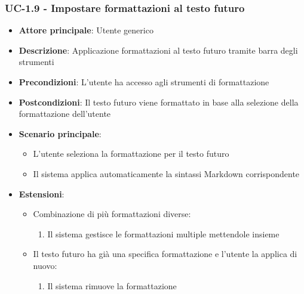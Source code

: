 \documentclass[11pt,a4paper]{article}
\begin{document}
\subsubsection{UC-1.9 - Impostare formattazioni al testo futuro}
\begin{itemize}
    \item \textbf{Attore principale}: Utente generico
    \item \textbf{Descrizione}: Applicazione formattazioni al testo futuro tramite barra degli strumenti
    \item \textbf{Precondizioni}: L’utente ha accesso agli strumenti di formattazione
    \item \textbf{Postcondizioni}: Il testo futuro viene formattato in base alla selezione della formattazione dell’utente
    \item \textbf{Scenario principale}:
        \begin{itemize}
            \item L’utente seleziona la formattazione per il testo futuro
            \item Il sistema applica automaticamente la sintassi Markdown corrispondente
        \end{itemize}
    \item \textbf{Estensioni}:
        \begin{itemize}
            \item Combinazione di più formattazioni diverse:
                \begin{enumerate}
                    \item Il sistema gestisce le formattazioni multiple mettendole insieme
                \end{enumerate}
            \item Il testo futuro ha già una specifica formattazione e l'utente la applica di nuovo:
                \begin{enumerate}
                    \item Il sistema rimuove la formattazione
                \end{enumerate}
        \end{itemize}
\end{itemize}
\end{document}
